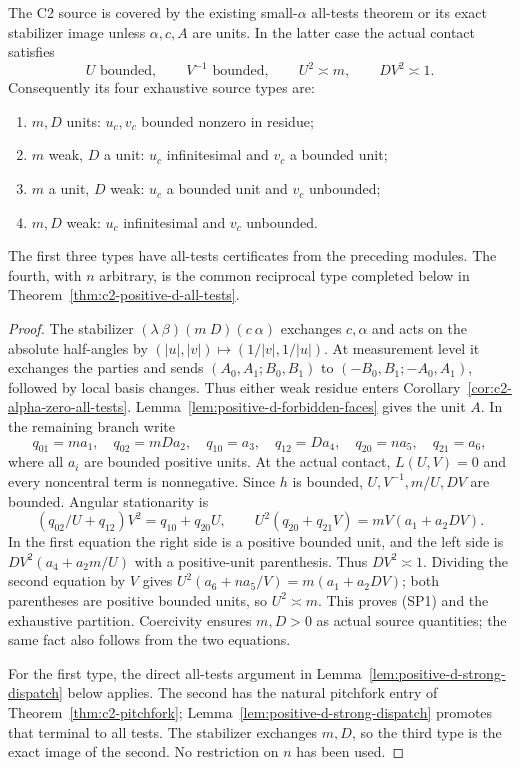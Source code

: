 \begin{proposition}
\label{prop:c2-positive-d-partition}
The C2 source is covered by the existing small-$\alpha$ all-tests
theorem or its exact stabilizer image unless $\alpha,c,A$ are units.
In the latter case the actual contact satisfies
\[
 U\text{ bounded},\qquad V^{-1}\text{ bounded},\qquad
 U^2\asymp m,\qquad DV^2\asymp1.                 \tag{SP1}
\]
Consequently its four exhaustive source types are:
\begin{enumerate}
\item $m,D$ units: $u_c,v_c$ bounded nonzero in residue;
\item $m$ weak, $D$ a unit: $u_c$ infinitesimal and $v_c$ a bounded unit;
\item $m$ a unit, $D$ weak: $u_c$ a bounded unit and $v_c$ unbounded;
\item $m,D$ weak: $u_c$ infinitesimal and $v_c$ unbounded.
\end{enumerate}
The first three types have all-tests certificates from the preceding
modules. The fourth, with $n$ arbitrary, is the common reciprocal
type completed below in Theorem~\ref{thm:c2-positive-d-all-tests}.
\end{proposition}
\begin{proof}
The stabilizer $(\lambda\ \beta)(m\ D)(c\ \alpha)$ exchanges
$c,\alpha$ and acts on the absolute half-angles by
$(|u|,|v|)\mapsto(1/|v|,1/|u|)$. At measurement level it exchanges
the parties and sends $(A_0,A_1;B_0,B_1)$ to
$(-B_0,B_1;-A_0,A_1)$, followed by local basis changes.
Thus either weak residue enters
Corollary~\ref{cor:c2-alpha-zero-all-tests}. Lemma~\ref{lem:positive-d-forbidden-faces}
gives the unit $A$. In the remaining branch write
\[
 q_{01}=ma_1,\quad q_{02}=mDa_2,\quad q_{10}=a_3,
 \quad q_{12}=Da_4,\quad q_{20}=na_5,\quad q_{21}=a_6,
\]
where all $a_i$ are bounded positive units. At the actual contact,
$L(U,V)=0$ and every noncentral term is nonnegative. Since $h$ is
bounded, $U,V^{-1},m/U,DV$ are bounded. Angular stationarity is
\[
 (q_{02}/U+q_{12})V^2=q_{10}+q_{20}U,
 \qquad U^2(q_{20}+q_{21}V)=mV(a_1+a_2DV).
\]
In the first equation the right side is a positive bounded unit,
and the left side is $DV^2(a_4+a_2m/U)$ with a positive-unit
parenthesis. Thus $DV^2\asymp1$. Dividing the second equation by
$V$ gives $U^2(a_6+na_5/V)=m(a_1+a_2DV)$; both parentheses
are positive bounded units, so $U^2\asymp m$. This proves (SP1)
and the exhaustive partition. Coercivity ensures $m,D>0$ as actual
source quantities; the same fact also follows from the two equations.

For the first type, the direct all-tests argument in
Lemma~\ref{lem:positive-d-strong-dispatch} below applies. The second
has the natural pitchfork entry of Theorem~\ref{thm:c2-pitchfork};
Lemma~\ref{lem:positive-d-strong-dispatch} promotes that terminal
to all tests. The stabilizer exchanges $m,D$, so the third type is
the exact image of the second. No restriction on $n$ has been used.
\end{proof}

